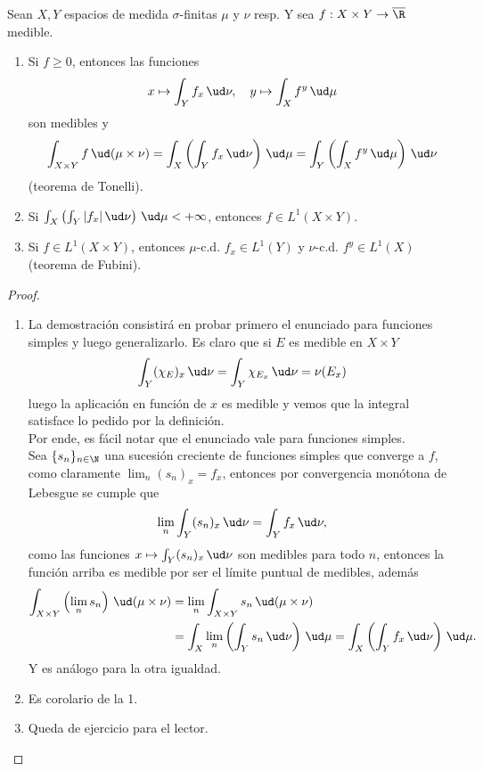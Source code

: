 \begin{thmi}
	Sean $X,Y$ espacios de medida $\sigma$-finitas $\mu$ y $\nu$ resp. Y sea $f:X\times Y \to \overline\R$ medible.
	\begin{enumerate}
		\item Si $f\ge 0$, entonces las funciones
			$$ x\mapsto\int_Y f_x\,\ud\nu,\quad y\mapsto\int_X f^y\,\ud\mu $$
			son medibles y
			$$ \int_{X\times Y}f\,\ud(\mu\times\nu) = \int_X \left( \int_Y f_x\,\ud\nu \right)\,\ud\mu = \int_Y \left( \int_X f^y\,\ud\mu \right)\,\ud\nu $$
			(teorema de Tonelli).
		\item Si $\int_X \left( \int_Y|f_x|\,\ud\nu \right) \,\ud\mu < +\infty$, entonces $f\in L^1(X\times Y)$.
		\item Si $f \in L^1(X\times Y)$, entonces $\mu$-c.d. $f_x\in L^1(Y)$ y $\nu$-c.d. $f^y\in L^1(X)$ (teorema de Fubini).
	\end{enumerate}
\end{thmi}
\begin{proof}
	\begin{enumerate}
		\item La demostración consistirá en probar primero el enunciado para funciones simples y luego generalizarlo.
			Es claro que si $E$ es medible en $X\times Y$
			$$ \int_Y (\chi_E)_x\,\ud\nu = \int_Y \chi_{E_x}\,\ud\nu = \nu(E_x) $$
			luego la aplicación en función de $x$ es medible y vemos que la integral satisface lo pedido por la definición.
			\\
			Por ende, es fácil notar que el enunciado vale para funciones simples.
			\\
			Sea $\{s_n\}_{n\in\N}$ una sucesión creciente de funciones simples que converge a $f$, como claramente $\lim_n (s_n)_x = f_x$, entonces por convergencia monótona de Lebesgue se cumple que
			$$ \lim_n\int_Y (s_n)_x\,\ud\nu = \int_Y f_x\,\ud\nu, $$
			como las funciones $x\mapsto\int_Y (s_n)_x\,\ud\nu$ son medibles para todo $n$, entonces la función arriba es medible por ser el límite puntual de medibles, además
			\begin{align*}
				\int_{X\times Y} \left(\lim_n s_n\right) \,\ud(\mu\times\nu) &= \lim_n \int_{X\times Y} s_n\,\ud(\mu\times\nu)\\
				&= \int_X \lim_n\left( \int_Y s_n\,\ud\nu \right)\,\ud\mu = \int_X \left( \int_Y f_x\,\ud\nu \right)\,\ud\mu.
			\end{align*}
			Y es análogo para la otra igualdad.
		\item Es corolario de la 1.
		\item Queda de ejercicio para el lector. \qedhere
	\end{enumerate}
\end{proof}
\thmdep{}

